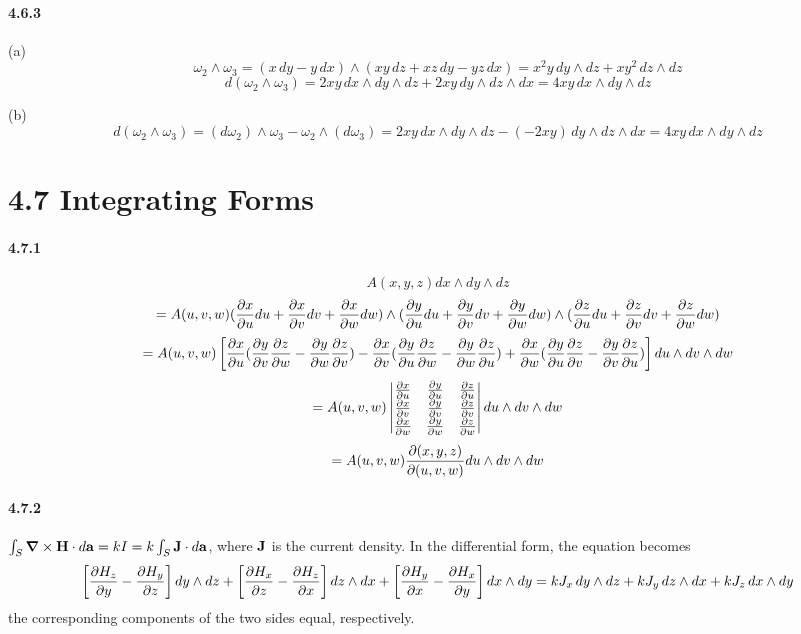 \documentclass[a4paper]{article}
\begin{document}
\paragraph{4.6.3}
(a)
\[
\omega_2\wedge\omega_3=(x\,dy-y\,dx)\wedge(xy\,dz+xz\,dy-yz\,dx)=x^2y\,dy\wedge dz+xy^2\,dz\wedge dz
\]
\[
d(\omega_2\wedge\omega_3)=2xy\,dx\wedge dy\wedge dz+2xy\,dy\wedge dz\wedge dx=4xy\,dx\wedge dy\wedge dz
\]

(b) 
\[
d(\omega_2\wedge\omega_3)=(d\omega_2)\wedge\omega_3-\omega_2\wedge(d\omega_3)=2xy\,dx\wedge dy\wedge dz-(-2xy)\,dy\wedge dz\wedge dx=4xy\,dx\wedge dy\wedge dz
\]

\section*{4.7 Integrating Forms}

\paragraph{4.7.1}
\[
A(x,y,z)dx\wedge dy\wedge dz
\]
\[
=A(u,v,w)(\frac{\partial x}{\partial u}du+\frac{\partial x}{\partial v}dv+\frac{\partial x}{\partial w}dw)\wedge(\frac{\partial y}{\partial u}du+\frac{\partial y}{\partial v}dv+\frac{\partial y}{\partial w}dw)\wedge(\frac{\partial z}{\partial u}du+\frac{\partial z}{\partial v}dv+\frac{\partial z}{\partial w}dw)
\]
\[
=A(u,v,w)\left[\frac{\partial x}{\partial u}(\frac{\partial y}{\partial v}\frac{\partial z}{\partial w}-\frac{\partial y}{\partial w}\frac{\partial z}{\partial v})-\frac{\partial x}{\partial v}(\frac{\partial y}{\partial u}\frac{\partial z}{\partial w}-\frac{\partial y}{\partial w}\frac{\partial z}{\partial u})+\frac{\partial x}{\partial w}(\frac{\partial y}{\partial u}\frac{\partial z}{\partial v}-\frac{\partial y}{\partial v}\frac{\partial z}{\partial u}) \right]du\wedge dv\wedge dw
\]
\[
=A(u,v,w)
\begin{vmatrix}
\frac{\partial x}{\partial u}&\frac{\partial y}{\partial u}&\frac{\partial z}{\partial u}\\
\frac{\partial x}{\partial v}&\frac{\partial y}{\partial v}&\frac{\partial z}{\partial v}\\
\frac{\partial x}{\partial w}&\frac{\partial y}{\partial w}&\frac{\partial z}{\partial w}\\
\end{vmatrix}
du\wedge dv\wedge dw\]
\[=A(u,v,w)\frac{\partial(x,y,z)}{\partial(u,v,w)}du\wedge dv\wedge dw
\]

\paragraph{4.7.2}
$\int\displaylimits_S\boldsymbol{\nabla}\times\mathbf{H}\cdot d\mathbf{a}=kI=k\int\displaylimits_S\mathbf{J}\cdot d\mathbf{a}$, where $\mathbf{J}$ is the current density. In the differential form, the equation becomes
\[
\left[\frac{\partial H_z}{\partial y}-\frac{\partial H_y}{\partial z}\right]dy\wedge dz+\left[\frac{\partial H_x}{\partial z}-\frac{\partial H_z}{\partial x}\right]dz\wedge dx+\left[\frac{\partial H_y}{\partial x}-\frac{\partial H_x}{\partial y}\right]dx\wedge dy=kJ_x\,dy\wedge dz+kJ_y\,dz\wedge dx+kJ_z\,dx\wedge dy
\]
the corresponding components of the two sides equal, respectively.
\end{document}
